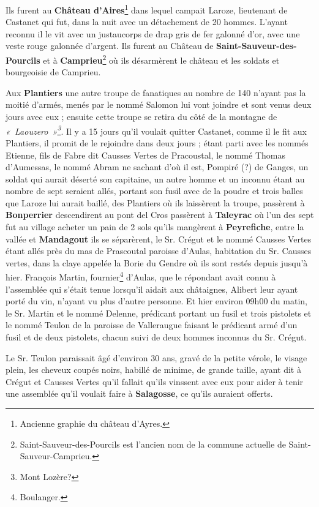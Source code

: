 Ils furent au \textbf{Château d'Aires}\footnote{Ancienne graphie du château d'Ayres.} dans lequel campait Laroze, lieutenant de Castanet qui fut, dans la nuit avec un détachement de 20 hommes. L’ayant reconnu il le vit avec un justaucorps de drap gris de fer galonné d’or, avec une veste rouge galonnée d’argent. Ils furent au Château de \textbf{Saint-Sauveur-des-Pourcils} et à \textbf{Camprieu}\footnote{Saint-Sauveur-des-Pourcils est l'ancien nom de la commune actuelle de Saint-Sauveur-Camprieu.} où ils désarmèrent le château et les soldats et bourgeoisie de Camprieu.

Aux \textbf{Plantiers} une autre troupe de fanatiques au nombre de 140 n’ayant pas la moitié d’armés, menés par le nommé Salomon lui vont joindre et sont venus deux jours avec eux ; ensuite cette troupe se retira du côté de la montagne de \textit{«~Laouzero~»\footnote{Mont Lozère?}}. Il y a 15 jours qu’il voulait quitter Castanet, comme il le fit aux Plantiers, il promit de le rejoindre dans deux jours ; étant parti avec les nommés Etienne, fils de Fabre dit Causses Vertes de Pracoustal, le nommé Thomas d’Aumessas, le nommé Abram ne sachant d’où il est, Pompiré (?) de Ganges, un soldat qui aurait déserté son capitaine, un autre homme et un inconnu étant au nombre de sept seraient allés, portant son fusil avec de la poudre et trois balles que Laroze lui aurait baillé, des Plantiers où ils laissèrent la troupe, passèrent à \textbf{Bonperrier} descendirent au pont del Cros passèrent à \textbf{Taleyrac} où l’un des sept fut au village acheter un pain de 2 sols qu’ils mangèrent à \textbf{Peyrefiche}, entre la vallée et \textbf{Mandagout} ils se séparèrent, le Sr. Crégut et le nommé Causses Vertes étant allés près du mas de Prascoutal paroisse d’Aulas, habitation du Sr. Causses vertes, dans la claye appelée la Borie du Gendre où ils sont restés depuis jusqu’à hier. François Martin, fournier\footnote{Boulanger.} d’Aulas, que le répondant avait connu à l’assemblée qui s’était tenue lorsqu’il aidait aux châtaignes, Alibert leur ayant porté du vin, n’ayant vu plus d’autre personne. Et hier environ 09h00 du matin, le Sr. Martin et le nommé Delenne, prédicant portant un fusil et trois pistolets et le nommé Teulon de la paroisse de Valleraugue faisant le prédicant armé d’un fusil et de deux pistolets, chacun suivi de deux hommes inconnus du Sr. Crégut.

Le Sr. Teulon paraissait âgé d’environ 30 ans, gravé de la petite vérole, le visage plein, les cheveux coupés noirs, habillé de minime, de grande taille, ayant dit à Crégut et Causses Vertes qu’il fallait qu’ils vinssent avec eux pour aider à tenir une assemblée qu’il voulait faire à \textbf{Salagosse}, ce qu’ils auraient offerts.

